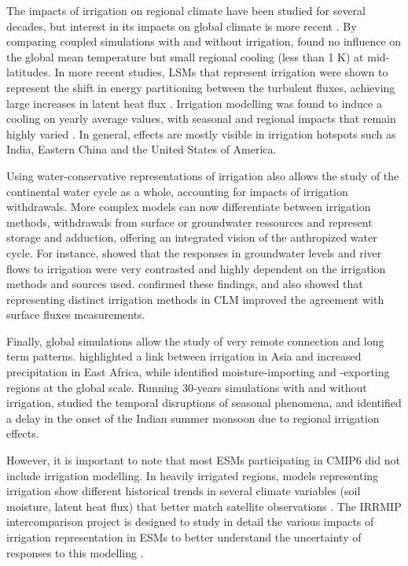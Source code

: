 The impacts of irrigation on regional climate have been studied for several decades, but interest in its impacts on global climate is more recent \citep{boucher_direct_2004}. By comparing coupled simulations with and without irrigation, \citet{sacks_effects_2009} found no influence on the global mean temperature but small regional cooling (less than 1 K) at mid-latitudes. In more recent studies, LSMs that represent irrigation were shown to represent the shift in energy partitioning between the turbulent fluxes, achieving large increases in latent heat flux \citep{pokhrel_incorporating_2012, arboleda-obando_validation_2024, al-yaari_role_2022}. Irrigation modelling was found to induce a cooling on yearly average values, with seasonal and regional impacts that remain highly varied \citep{puma_effects_2010, cook_irrigation_2015}. In general, effects are mostly visible in irrigation hotspots such as India, Eastern China and the United States of America. 

Using water-conservative representations of irrigation also allows the study of the continental water cycle as a whole, accounting for impacts of irrigation withdrawals. More complex models can now differentiate between irrigation methods, withdrawals from surface or groundwater ressources and represent storage and adduction, offering an integrated vision of the anthropized water cycle. %
For instance, \citep{leng_significant_2017} showed that the responses in groundwater levels and river flows to irrigation were very contrasted and highly dependent on the irrigation methods and sources used.  \citet{yao_implementation_2022} confirmed these findings, and also showed that representing distinct irrigation methods in CLM improved the agreement with surface fluxes measurements.

Finally, global simulations allow the study of very remote connection and long term patterns. \citep{de_vrese_asian_2016} highlighted a link between irrigation in Asia and increased precipitation in East Africa, while \citep{wei_where_2013} identified moisture-importing and -exporting regions at the global scale. Running 30-years simulations with and without irrigation, \citep{guimberteau_global_2012} studied the temporal disruptions of seasonal phenomena, and identified a delay in the onset of the Indian summer monsoon due to regional irrigation effects.

However, it is important to note that most ESMs participating in CMIP6 did not include irrigation modelling. In heavily irrigated regions, models representing irrigation show different historical trends in several climate variables (soil moisture, latent heat flux) that better match satellite observations \citep{al-yaari_role_2022}. 
The IRRMIP intercomparison project is designed to study in detail the various impacts of irrigation representation in ESMs to better understand the uncertainty of responses to this modelling \citep{yao_irrigation-expansion-induced_2023}.

